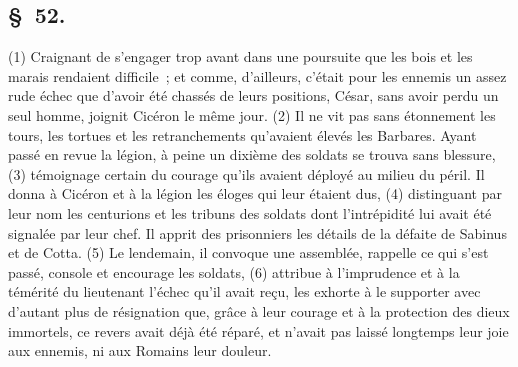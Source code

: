 \documentclass[french,twoside]{book} %
\begin{document}
\subsection[{§ 52.}]{ \textsc{§ 52.} }
\noindent (1) Craignant de s’engager trop avant dans une poursuite que les bois et les marais rendaient difficile ; et comme, d’ailleurs, c’était pour les ennemis un assez rude échec que d’avoir été chassés de leurs positions, César, sans avoir perdu un seul homme, joignit Cicéron le même jour. (2) Il ne vit pas sans étonnement les tours, les tortues et les retranchements qu’avaient élevés les Barbares. Ayant passé en revue la légion, à peine un dixième des soldats se trouva sans blessure, (3) témoignage certain du courage qu’ils avaient déployé au milieu du péril. Il donna à Cicéron et à la légion les éloges qui leur étaient dus, (4) distinguant par leur nom les centurions et les tribuns des soldats dont l’intrépidité lui avait été signalée par leur chef. Il apprit des prisonniers les détails de la défaite de Sabinus et de Cotta. (5) Le lendemain, il convoque une assemblée, rappelle ce qui s’est passé, console et encourage les soldats, (6) attribue à l’imprudence et à la témérité du lieutenant l’échec qu’il avait reçu, les exhorte à le supporter avec d’autant plus de résignation que, grâce à leur courage et à la protection des dieux immortels, ce revers avait déjà été réparé, et n’avait pas laissé longtemps leur joie aux ennemis, ni aux Romains leur douleur.
\end{document}

